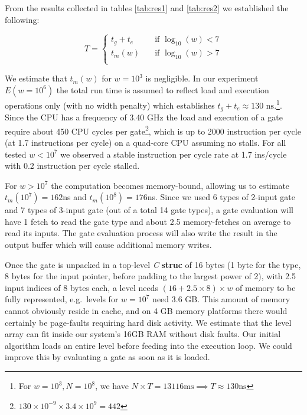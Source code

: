 \par
From the results collected in tables \ref{tab:res1} and \ref{tab:res2} we established the following:

\[ T =
  \begin{cases}
    t_g + t_e       & \quad \text{if } \log_{10}(w) < 7\\
    t_m(w) & \quad \text{if } \log_{10}(w) > 7\\
  \end{cases}
\]

We estimate that $t_m(w)$ for $w = 10^3$ is negligible. In our experiment $E(w = 10^6)$ the total run time is assumed to reflect load and execution operations only (with no width penalty) which establishes $t_g + t_e \approx 130\text{ ns}$.\footnote{ For $w = 10^3, N=10^8$, we have $N \times T = 13116 \text{ms} \implies T \approx 130 \text{ns}$ }. 
Since the CPU has a frequency of 3.40 GHz the load and execution of a gate require about 450 CPU cycles per gate\footnote{$130 \times 10^{-9} \times 3.4 \times 10^9 = 442$}, which is up to 2000 instruction per cycle (at 1.7 instructions per cycle) on a quad-core CPU assuming no stalls. For all tested $w < 10^7$ we observed a stable instruction per cycle rate at 1.7 ins/cycle with 0.2 instruction per cycle stalled.
\par
For $ w > 10^7$ the computation becomes memory-bound, allowing us to estimate $t_m(10^7) = 162$ns and $t_m(10^8) = 176$ns. Since we used 6 types of 2-input gate and 7 types of 3-input gate (out of a total 14 gate types), a gate evaluation will have 1 fetch to read the gate type and about 2.5 memory-fetches on average to read its inputs. The gate evaluation process will also write the result in the output buffer which will cause additional memory writes. 
\par
Once the gate is unpacked in a top-level \textit{C} \textbf{struc} of 16 bytes (1 byte for the type, 8 bytes for the input pointer, before padding to the largest power of 2), with 2.5 input indices of 8 bytes each, a level needs $ (16 + 2.5 \times 8) \times w $ of memory to be fully represented, e.g.\ levels for $w = 10^7$ need 3.6 GB. This amount of memory cannot obviously reside in cache, and on 4 GB memory platforms there would certainly be page-faults requiring hard disk activity. We estimate that the level array can fit inside our system's 16GB RAM without disk faults. Our initial algorithm loads an entire level before feeding into the execution loop. We could improve this by evaluating a gate as soon as it is loaded.  
\par
